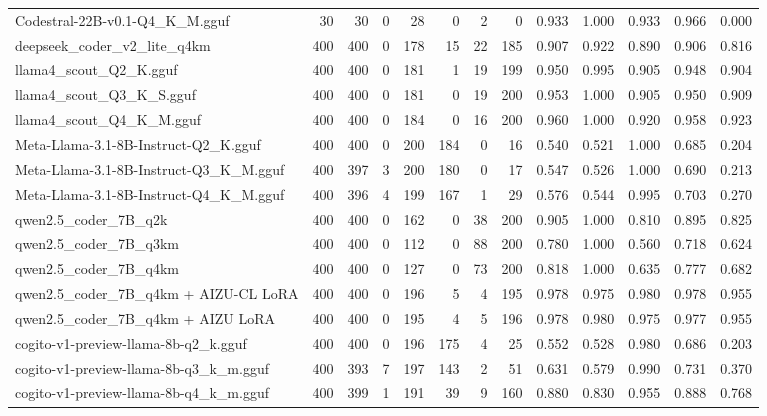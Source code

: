 \begin{table}[htbp]
{\begin{tabular}{lrrrrrrrrrrrr}
    Codestral-22B-v0.1-Q4\_K\_M.gguf & 30 & 30 & 0 & 28 & 0 & 2 & 0 & 0.933 & 1.000 & 0.933 & 0.966 & 0.000 \\
    deepseek\_coder\_v2\_lite\_q4km & 400 & 400 & 0 & 178 & 15 & 22 & 185 & 0.907 & 0.922 & 0.890 & 0.906 & 0.816 \\
    llama4\_scout\_Q2\_K.gguf & 400 & 400 & 0 & 181 & 1 & 19 & 199 & 0.950 & 0.995 & 0.905 & 0.948 & 0.904 \\
    llama4\_scout\_Q3\_K\_S.gguf & 400 & 400 & 0 & 181 & 0 & 19 & 200 & 0.953 & 1.000 & 0.905 & 0.950 & \cellcolor{green!10}0.909 \\
    llama4\_scout\_Q4\_K\_M.gguf & 400 & 400 & 0 & 184 & 0 & 16 & 200 & 0.960 & 1.000 & 0.920 & 0.958 & \cellcolor{green!30}0.923 \\
    Meta-Llama-3.1-8B-Instruct-Q2\_K.gguf & 400 & 400 & 0 & 200 & 184 & 0 & 16 & 0.540 & 0.521 & 1.000 & 0.685 & 0.204 \\
    Meta-Llama-3.1-8B-Instruct-Q3\_K\_M.gguf & 400 & 397 & 3 & 200 & 180 & 0 & 17 & 0.547 & 0.526 & 1.000 & 0.690 & 0.213 \\
    Meta-Llama-3.1-8B-Instruct-Q4\_K\_M.gguf & 400 & 396 & 4 & 199 & 167 & 1 & 29 & 0.576 & 0.544 & 0.995 & 0.703 & 0.270 \\
    qwen2.5\_coder\_7B\_q2k & 400 & 400 & 0 & 162 & 0 & 38 & 200 & 0.905 & 1.000 & 0.810 & 0.895 & 0.825 \\
    qwen2.5\_coder\_7B\_q3km & 400 & 400 & 0 & 112 & 0 & 88 & 200 & 0.780 & 1.000 & 0.560 & 0.718 & 0.624 \\
    qwen2.5\_coder\_7B\_q4km & 400 & 400 & 0 & 127 & 0 & 73 & 200 & 0.818 & 1.000 & 0.635 & 0.777 & 0.682 \\
    qwen2.5\_coder\_7B\_q4km + AIZU-CL LoRA & 400 & 400 & 0 & 196 & 5 & 4 & 195 & 0.978 & 0.975 & 0.980 & 0.978 & \cellcolor{green!50}0.955 \\
    qwen2.5\_coder\_7B\_q4km + AIZU LoRA & 400 & 400 & 0 & 195 & 4 & 5 & 196 & 0.978 & 0.980 & 0.975 & 0.977 & \cellcolor{green!40}0.955 \\
    cogito-v1-preview-llama-8b-q2\_k.gguf & 400 & 400 & 0 & 196 & 175 & 4 & 25 & 0.552 & 0.528 & 0.980 & 0.686 & 0.203 \\
    cogito-v1-preview-llama-8b-q3\_k\_m.gguf & 400 & 393 & 7 & 197 & 143 & 2 & 51 & 0.631 & 0.579 & 0.990 & 0.731 & 0.370 \\
    cogito-v1-preview-llama-8b-q4\_k\_m.gguf & 400 & 399 & 1 & 191 & 39 & 9 & 160 & 0.880 & 0.830 & 0.955 & 0.888 & 0.768 \\
    \midrule

\end{tabular}}
\end{table}
